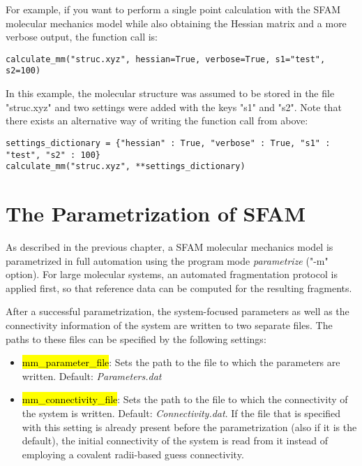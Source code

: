 \documentclass[]{tufte-book}
\begin{document}
For example, if you want to perform a single point calculation with the SFAM molecular mechanics model while also obtaining the Hessian matrix and a more verbose output, the function call is:
\begin{mdframed}[backgroundcolor=LightSteelBlue!25, userdefinedwidth=13.7cm, linewidth=0pt]
\begin{verbatim}
calculate_mm("struc.xyz", hessian=True, verbose=True, s1="test", s2=100)
\end{verbatim}
\end{mdframed}
In this example, the molecular structure was assumed to be stored in the file "struc.xyz" and two settings were added with the keys "s1" and "s2". Note that there exists an alternative way of writing the function call from above:
\begin{mdframed}[backgroundcolor=LightSteelBlue!25, userdefinedwidth=16cm, linewidth=0pt]
\begin{verbatim}
settings_dictionary = {"hessian" : True, "verbose" : True, "s1" : "test", "s2" : 100}
calculate_mm("struc.xyz", **settings_dictionary)
\end{verbatim}
\end{mdframed}

\chapter{The Parametrization of SFAM}\label{ch:mm_parametrization}
\label{sec:parametrization}

As described in the previous chapter, a SFAM molecular mechanics model is parametrized in full automation using the program mode \textit{parametrize} ("-m" option). For large molecular systems, an automated fragmentation protocol is applied first, so that reference data can be computed for the resulting fragments.

After a successful parametrization, the system-focused parameters as well as the connectivity information of the system are written to two separate files.
The paths to these files can be specified by the following settings:

\begin{itemize}
\item \hl{mm\_parameter\_file}: Sets the path to the file to which the parameters are written. Default: \textit{Parameters.dat}
\item \hl{mm\_connectivity\_file}: Sets the path to the file to which the connectivity of the system is written. Default: \textit{Connectivity.dat}. If the file that is specified with this setting is already present before the parametrization (also if it is the default), the initial connectivity of the system is read from it instead of employing a covalent radii-based guess connectivity.
\end{itemize}
\end{document}
